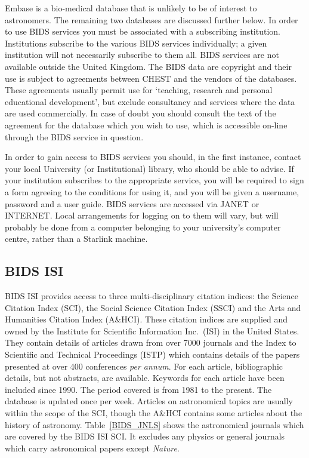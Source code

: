\documentclass[twoside,11pt,nolof]{starlink}
\begin{document}
Embase is a bio-medical database that is unlikely to be of interest to
astronomers. The remaining two databases are discussed further below.
In order to use BIDS services you must be associated with a subscribing
institution. Institutions subscribe to the various BIDS services
individually; a given institution will not necessarily subscribe to them
all. BIDS services are not available outside the United Kingdom. The
BIDS data are copyright and their use is subject to agreements between
CHEST and the vendors of the databases. These agreements usually
permit use for `teaching, research and personal educational
development', but exclude consultancy and services where the data are
used commercially. In case of doubt you should consult the text of the
agreement for the database which you wish to use, which is accessible
on-line through the BIDS service in question.

In order to gain access to BIDS services you should, in the first
instance, contact your local University (or Institutional) library, who
should be able to advise. If your institution subscribes to the
appropriate service, you will be required to sign a form agreeing to
the conditions for using it, and you will be given a username, password
and a user guide. BIDS services are accessed via JANET or INTERNET.
Local arrangements for logging on to them will vary, but will probably
be done from a computer belonging to your university's computer centre,
rather than a Starlink machine.

\subsection{BIDS ISI
\label{BIDS_ISI}}

BIDS ISI provides access to three multi-disciplinary citation indices:
the Science Citation Index (SCI), the Social Science Citation Index
(SSCI) and the Arts and Humanities Citation Index (A\&HCI). These
citation indices are supplied and owned by the Institute for Scientific
Information Inc.~(ISI) in the United States. They contain details of
articles drawn from over 7000 journals and the Index to Scientific and
Technical Proceedings (ISTP) which contains details of the papers
presented at over 400 conferences \textit{per annum}. For each article,
bibliographic details, but not abstracts, are available. Keywords for
each article have been included since 1990. The period covered is from
1981 to the present. The database is updated once per week. Articles
on astronomical topics are usually within the scope of the SCI, though
the A\&HCI contains some articles about the history of astronomy.
Table~\ref{BIDS_JNLS} shows the astronomical journals which are covered
by the BIDS ISI SCI. It excludes any physics or general journals which
carry astronomical papers except \textit{Nature}.
\end{document}
